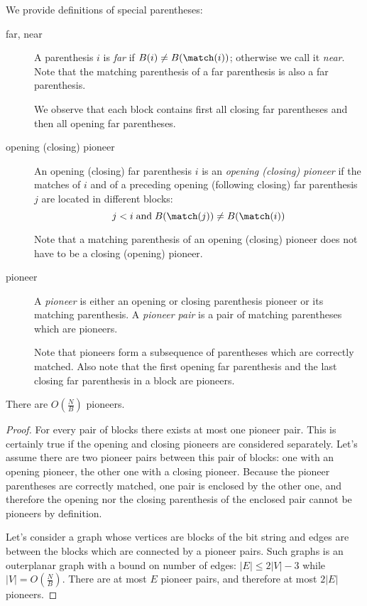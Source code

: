 We provide definitions of special parentheses:
\begin{description}
	\item[far, near] 
	A parenthesis $i$ is \emph{far} if $B(i) \ne B(\match(i))$; otherwise we call it \emph{near}.
	Note that the matching parenthesis of a far parenthesis is also a far parenthesis.
	
	We observe that each block contains first all closing far parentheses and then all opening far parentheses.
	
	\item[opening (closing) pioneer]
	An opening (closing) far parenthesis $i$ is an \emph{opening (closing) pioneer} if the matches of $i$ and of a preceding opening (following closing) far parenthesis $j$ are located in different blocks:
	$$ j < i \booland B(\match(j)) \ne B(\match(i)) $$
	
	Note that a matching parenthesis of an opening (closing) pioneer does not have to be a closing (opening) pioneer.
	
	\item[pioneer]
	A \emph{pioneer} is either an opening or closing parenthesis pioneer or its matching parenthesis.
	A \emph{pioneer pair} is a pair of matching parentheses which are pioneers.
	
	Note that pioneers form a subsequence of parentheses which are correctly matched.
	Also note that the first opening far parenthesis and the last closing far parenthesis in a block are pioneers.
\end{description}

\begin{lemma}
	There are $O(\frac{N}{B})$ pioneers.
\end{lemma}
\begin{proof}
	For every pair of blocks there exists at most one pioneer pair.
	This is certainly true if the opening and closing pioneers are considered separately.
	Let's assume there are two pioneer pairs between this pair of blocks: one with an opening pioneer, the other one with a closing pioneer.
	Because the pioneer parentheses are correctly matched, one pair is enclosed by the other one, and therefore the opening nor the closing parenthesis of the enclosed pair cannot be pioneers by definition.
	
	Let's consider a graph whose vertices are blocks of the bit string and edges are between the blocks which are connected by a pioneer pairs.
	Such graphs is an outerplanar graph with a bound on number of edges: $|E| \le 2 |V| - 3$ while $|V| = O(\frac{N}{B})$.
	There are at most $E$ pioneer pairs, and therefore at most $2 |E|$ pioneers.
\end{proof}

